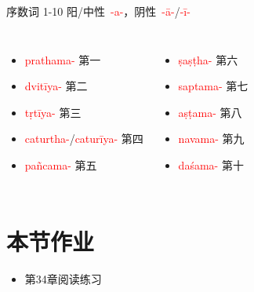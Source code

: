 \documentclass[17pt]{beamer}
\newcommand{\nounstem}[1]{\textcolor{red}{#1\nobreakdash-}}
\begin{document}
\begin{frame}{序数词 1-10}
  \small
  \mbox{阳/中性 \nounstem{-a}，阴性 \nounstem{-ā}/\nounstem{-ī}}\\
  \begin{columns}
    \begin{itemize}
      \item \nounstem{prathama} 第一
      \item \nounstem{dvitīya} 第二
      \item \nounstem{tṛtīya} 第三
      \item \nounstem{caturtha}/\nounstem{caturīya} 第四
      \item \nounstem{pañcama} 第五
    \end{itemize}
    \begin{itemize}
      \item \nounstem{ṣaṣṭha} 第六
      \item \nounstem{saptama} 第七
      \item \nounstem{aṣṭama} 第八
      \item \nounstem{navama} 第九
      \item \nounstem{daśama} 第十
    \end{itemize}
  \end{columns}
\end{frame}


\section{本节作业}

\begin{frame}{\insertsection}
  \begin{itemize}
    \item 第34章阅读练习
  \end{itemize}
\end{frame}
\end{document}

